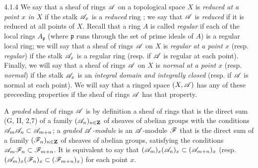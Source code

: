 \documentclass[10pt,oneside]{book}
\begin{document}
\begin{env}{4.1.4}
\label{env-0.4.1.4}
We say that a sheaf of rings $\mathscr{A}$ on a topological space $X$ is \emph{reduced at a point
$x$ in $X$} if the stalk $\mathscr{A}_x$ is a \emph{reduced} ring ; we say that
$\mathscr{A}$ is \emph{reduced} if it is reduced at all points of $X$. Recall that a ring $A$ is
called \emph{regular} if each of the local rings $A_\mathfrak{p}$ (where $\mathfrak{p}$ runs
through the set of prime ideals of $A$) is a regular local ring; we will say that a sheaf of
rings $\mathscr{A}$ on $X$ is \emph{regular at a point $x$} (resp. \emph{regular}) if the stalk
$\mathscr{A}_x$ is a regular ring (resp. if $\mathscr{A}$ is regular at each point). Finally, we will
say that a sheaf of rings $\mathscr{A}$ on $X$ is \emph{normal at a point $x$} (resp.
\emph{normal}) if the stalk $\mathscr{A}_x$ is an \emph{integral domain and integrally closed}
(resp. if $\mathscr{A}$ is normal at each point). We will say that a ringed space $(X,\mathscr{A})$ has
any of these preceeding properties if the sheaf of rings $\mathscr{A}$ has that property.

A \emph{graded} sheaf of rings $\mathscr{A}$ is by definition a sheaf of rings that is the direct
sum (G, II, 2,7) of a family $(\mathscr{A}_n)_{n\in\mathbf{Z}}$ of sheaves of abelian groups with the
conditions $\mathscr{A}_m\mathscr{A}_n\subset\mathscr{A}_{m+n}$; a \emph{graded $\mathscr{A}$-module} is an
$\mathscr{A}$-module $\mathscr{F}$ that is the direct sum of a family $(\mathscr{F}_n)_{n\in\mathbf{Z}}$ of
sheaves of abelian groups, satisfying the conditions $\mathscr{A}_m\mathscr{F}_n\subset\mathscr{F}_{m+n}$.
It is equivalent to say that $(\mathscr{A}_m)_x(\mathscr{A}_n)_x\subset(\mathscr{A}_{m+n})_x$ (resp.
$(\mathscr{A}_m)_x(\mathscr{F}_n)_x\subset(\mathscr{F}_{m+n})_x$) for each point $x$.
\end{env}
\end{document}
